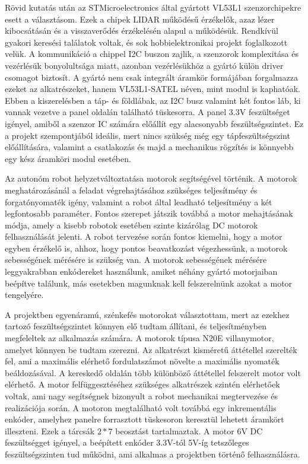 Rövid kutatás után az STMicroelectronics által gyártott VL53L1 szenzorchipekre
esett a választásom. Ezek a chipek LIDAR működésű érzékelők, azaz lézer
kibocsátásán és a visszaverődés érzékelésén alapul a működésük. Rendkívül gyakori
keresési találatok voltak, és sok hobbielektronikai projekt foglalkozott velük. A
kommunikáció a chippel I2C buszon zajlik, a szenzorok komplexitása és vezérlésük
bonyolultsága miatt, azonban vezérlésükhöz a gyártó külön driver csomagot
biztosít. A gyártó nem csak integrált áramkör formájában forgalmazza ezeket az
alkatrészeket, hanem VL53L1-SATEL néven, mint modul is kaphatóak. Ebben a
kiszerelésben a táp- és földlábak, az I2C busz valamint két fontos láb, ki vannak
vezetve a panel oldalán található tüskesorra.  A panel 3.3V feszültséget igényel,
amiből a szenzor IC számára előállít egy alacsonyabb feszültségszintet. Ez a
projekt szempontjából ideális, mert nincs szükség még egy tápfeszültségszint
előállítására, valamint a csatlakozás és majd a mechanikus rögzítés is könnyebb
egy kész áramköri modul esetében.


\medskip

Az autonóm robot helyzetváltoztatása motorok segítségével történik. A motorok
meghatározásánál a feladat végrehajtásához szükséges teljesítmény és
forgatónyomaték igény, valamint a robot által leadható teljesítmény a két
legfontosabb paraméter. Fontos szerepet játszik továbbá a motor mehajtásának
módja, amely a kisebb robotok esetében szinte kizárólag DC motorok felhasználását
jelenti. A robot tervezése során fontos kiemelni, hogy a motor egyben érzékelő
is, ahhoz, hogy pontos beavatkozást végezhessünk, a motorok sebességének mérésére
is szükség van. A motorok sebességének mérésére leggyakrabban enkódereket
használunk, amiket néhány gyártó motorjaiban beépítve találunk, más esetekben
magunknak kell felszerelnünk azokat a motor tengelyére.

A projektben egyenáramú, szénkefés motorokat választottam, mert az ezekhez
tartozó feszültségszintet könnyen elő tudtam állítani, és teljesítményben
megfeleltek az alkalmazás számára. A motorok típusa N20E villanymotor, amelyet
könnyen be tudtam szerezni. Az alkatrészt kisméretű áttétellel szerelték fel, ami
a maximális elérhető fordulatszámot növelte a maximális nyomaték beáldozásával. A
kereskedő oldalán több különböző áttétellel felszerelt motor volt elérhető.  A
motor felfüggesztéséhez szükséges alkatrészek szintén elérhetőek voltak, ami nagy
segítségnek bizonyult a robot mechanikai megtervezése és realizációja során. A
motoron megtalálható volt továbbá egy inkrementális enkóder, amelyhez panelre
forrasztott tüskesoron keresztül lehetett áramkört illeszteni. Ezek a tárcsák \(2
* 7\) beosztást tartalmaztak. A motor 6V DC feszültségget igényel, a beépített
enkóder 3.3V-tól 5V-íg tetszőleges feszültségszinten tud működni, ami alkalmas a
projektben történő felhasználásra.


